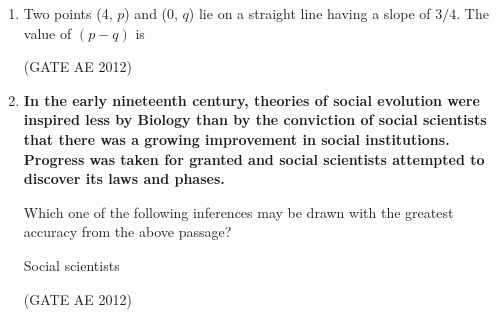 \documentclass[journal,12pt,onecolumn]{IEEEtran}
\theoremstyle{remark}
\begin{document}
\begin{enumerate}
    
    \item Two points (4, $p$) and (0, $q$) lie on a straight line having a slope of $3/4$. The value of $(p - q)$ is  
    \begin{enumerate}
    \end{enumerate}
    \hfill(GATE AE 2012)


    
    \item \textbf{In the early nineteenth century, theories of social evolution were inspired less by Biology than by the conviction of social scientists that there was a growing improvement in social institutions. Progress was taken for granted and social scientists attempted to discover its laws and phases.}  
    
    Which one of the following inferences may be drawn with the greatest accuracy from the above passage?  
    
    Social scientists  
    \begin{enumerate}
    \end{enumerate}
    \hfill(GATE AE 2012)



\newpage


    
\end{enumerate}
\end{document}
